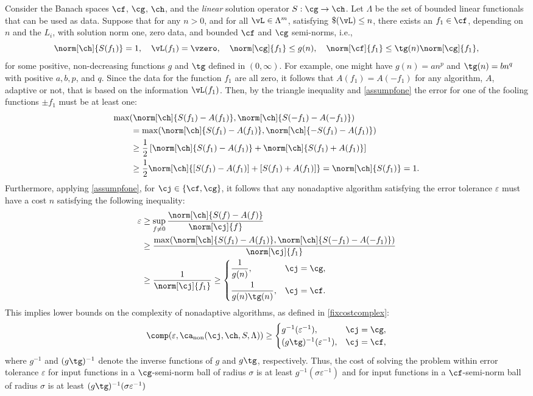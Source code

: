 \documentclass[final]{elsarticle}
\theoremstyle{definition}
\theoremstyle{remark}
\DeclareMathOperator{\fix}{non}
\begin{document}
Consider the Banach spaces $\cf$, $\cg$, $\ch$, and the \emph{linear} solution operator $S: \cg \to \ch$.  Let $\Lambda$ be the set of bounded linear functionals that can be used as data. Suppose that for any $n>0$, and for all $\vL \in \Lambda^m$, satisfying $\$(\vL)\le n$, there exists an $f_1 \in \cf$, depending on $n$ and the $L_i$, with solution norm one, zero data, and bounded $\cf$ and $\cg$ semi-norms, i.e.,
\begin{equation} \label{assumpfone}
\norm[\ch]{S(f_1)} = 1, \quad \vL(f_1)= \vzero, \quad
\norm[\cg]{f_1} \le g(n), \quad \norm[\cf]{f_1} \le \tg(n) \norm[\cg]{f_1}, 
\end{equation}
for some positive, non-decreasing functions $g$ and $\tg$ defined in $(0,\infty)$.  For example, one might have $g(n)=an^p$ and $\tg(n)=bn^q$ with positive $a, b, p$, and $q$.  Since the data for the function $f_1$ are all zero, it follows that $A(f_1)=A(-f_1)$ for any algorithm, $A$, adaptive or not, that is based on the information $\vL(f_1)$.  Then, by the triangle inequality and \eqref{assumpfone} the error for one of the fooling functions $\pm f_1$ must be at least one:
\begin{align*}
\MoveEqLeft{\max(\norm[\ch]{S(f_1)-A(f_1)},\norm[\ch]{S(-f_1)-A(-f_1)})} \\
& = \max(\norm[\ch]{S(f_1)-A(f_1)},\norm[\ch]{-S(f_1)-A(f_1)})\\
& \ge \frac{1}{2} \left[ \norm[\ch]{S(f_1)-A(f_1)}+ \norm[\ch]{S(f_1)+A(f_1)} \right] \\
& \ge \frac{1}{2} \norm[\ch]{[S(f_1)-A(f_1)]+[S(f_1)+A(f_1)]} = \norm[\ch]{S(f_1)}=1.
\end{align*}
Furthermore, applying \eqref{assumpfone}, for $\cj \in \{\cf,\cg\}$, it follows that any nonadaptive algorithm satisfying the error tolerance $\varepsilon$ must have a cost $n$ satisfying the following inequality:
\begin{align*}
\varepsilon & \ge \sup_{f \ne 0} \frac{\norm[\ch]{S(f)-A(f)}}{\norm[\cj]{f}} \\
& \ge \frac{\max(\norm[\ch]{S(f_1)-A(f_1)},\norm[\ch]{S(-f_1)-A(-f_1)})}{\norm[\cj]{f_1}} \\
& \ge \frac{1}{\norm[\cj]{f_1}} 
\ge \begin{cases} \displaystyle \frac{1}{g(n)}, & \cj=\cg,\\[2ex]
 \displaystyle  \frac{1}{g(n)\tg(n)}, & \cj=\cf.
\end{cases}
\end{align*}
This implies lower bounds on the complexity of nonadaptive algorithms, as defined in \eqref{fixcostcomplex}:
\[
\comp(\varepsilon,\ca_{\fix}(\cj,\ch,S,\Lambda)) \ge
\begin{cases} g^{-1}(\varepsilon^{-1}), & \cj=\cg,\\
(g\tg)^{-1}(\varepsilon^{-1}), & \cj=\cf,
\end{cases}
\]
where $g^{-1}$ and $(g\tg)^{-1}$ denote the inverse functions of $g$ and $g\tg$, respectively.
Thus, the cost of solving the problem within error tolerance $\varepsilon$ for input functions in a $\cg$-semi-norm ball of radius $\sigma$ is at least $g^{-1}(\sigma\varepsilon^{-1})$ and for input functions in a $\cf$-semi-norm ball of radius $\sigma$ is at least $(g\tg)^{-1}(\sigma\varepsilon^{-1})$
\end{document}
